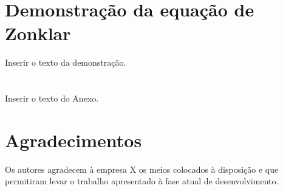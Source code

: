 \documentclass[journal, twoside, a4paper]{IEEEtran_LEEC_v1}
\begin{document}
%

\appendices
\section{Demonstração da equação de Zonklar}
Inserir o texto da demonstração.

\section{}
Inserir o texto do Anexo.

\section*{Agradecimentos}

Os autores agradecem à empresa X os meios colocados à disposição e que permitiram levar o trabalho apresentado à fase atual de desenvolvimento.

%
%


%



%
% 
\newpage
\end{document}
